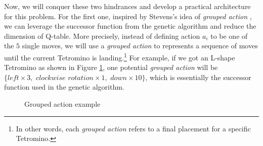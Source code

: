 \documentclass[letterpaper]{article} %
\begin{document}
Now, we will conquer these two hindrances and develop a practical architecture for this problem. For the first one, inspired by Stevens's idea of \textit{grouped action} \cite{Stevens_2016}, we can leverage the successor function from the genetic algorithm and reduce the dimension of Q-table. More precisely, instead of defining action $a_i$ to be one of the $5$ single moves, we will use a \textit{grouped action} to represents a sequence of moves until the current Tetromino is landing.\footnote{In other words, each \textit{grouped action} refers to a final placement for a specific Tetromino.} For example, if we got an L-shape Tetromino as shown in Figure \ref{fig:grouped_action}, one potential \textit{grouped action} will be $\{left\times 3, \,\,clockwise\,\,rotation \times 1,\,\,down\times 10\}$, which is essentially the successor function used in the genetic algorithm.

\begin{figure}[t!]
  \centering
  \hfill
  \caption{Grouped action example}
  \label{fig:grouped_action}
\end{figure}
\end{document}
